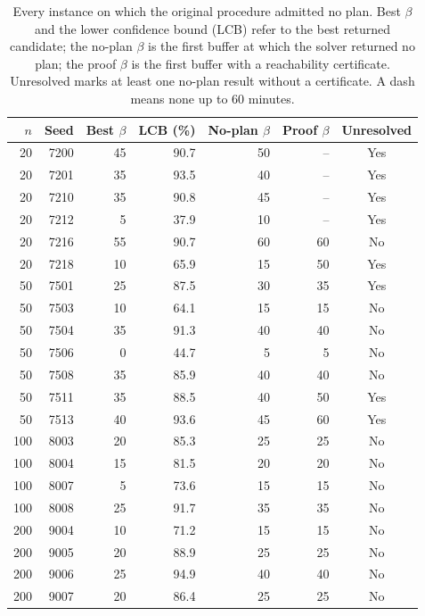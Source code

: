 \begin{table}[H]
\centering
\scriptsize
\caption{Every instance on which the original procedure admitted no plan. Best $\beta$ and the lower confidence bound (LCB) refer to the best returned candidate; the no-plan $\beta$ is the first buffer at which the solver returned no plan; the proof $\beta$ is the first buffer with a reachability certificate. Unresolved marks at least one no-plan result without a certificate. A dash means none up to 60 minutes.}
\label{tab:failure}
\begin{tabular}{rrrrrrc}
\toprule
$n$ & Seed & Best $\beta$ & LCB (\%) & No-plan $\beta$ & Proof $\beta$ & Unresolved\\
\midrule
20 & 7200 & 45 & 90.7 & 50 & -- & Yes\\
20 & 7201 & 35 & 93.5 & 40 & -- & Yes\\
20 & 7210 & 35 & 90.8 & 45 & -- & Yes\\
20 & 7212 & 5 & 37.9 & 10 & -- & Yes\\
20 & 7216 & 55 & 90.7 & 60 & 60 & No\\
20 & 7218 & 10 & 65.9 & 15 & 50 & Yes\\
50 & 7501 & 25 & 87.5 & 30 & 35 & Yes\\
50 & 7503 & 10 & 64.1 & 15 & 15 & No\\
50 & 7504 & 35 & 91.3 & 40 & 40 & No\\
50 & 7506 & 0 & 44.7 & 5 & 5 & No\\
50 & 7508 & 35 & 85.9 & 40 & 40 & No\\
50 & 7511 & 35 & 88.5 & 40 & 50 & Yes\\
50 & 7513 & 40 & 93.6 & 45 & 60 & Yes\\
100 & 8003 & 20 & 85.3 & 25 & 25 & No\\
100 & 8004 & 15 & 81.5 & 20 & 20 & No\\
100 & 8007 & 5 & 73.6 & 15 & 15 & No\\
100 & 8008 & 25 & 91.7 & 35 & 35 & No\\
200 & 9004 & 10 & 71.2 & 15 & 15 & No\\
200 & 9005 & 20 & 88.9 & 25 & 25 & No\\
200 & 9006 & 25 & 94.9 & 40 & 40 & No\\
200 & 9007 & 20 & 86.4 & 25 & 25 & No\\
\bottomrule
\end{tabular}
\end{table}


